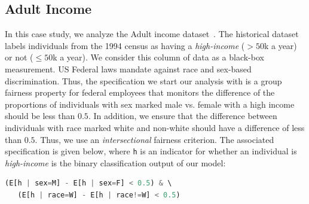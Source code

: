 \subsection{Adult Income}
\label{sec:casestudy:adult}
In this case study, we analyze the Adult income dataset~\citep{kohavi1996scaling}.
The historical dataset labels individuals from the 1994 census as having a \emph{high-income} ($>50$k a year) or not ($\leq50$k a year).
We consider this column of data as a black-box measurement. 
US Federal laws mandate against race and sex-based discrimination.
Thus, the specification we start our analysis with is a group fairness property for federal employees that monitors the difference of the proportions of individuals with sex marked male vs. female with a high income should be less than $0.5$.
In addition, we ensure that the difference between individuals with race marked white and non-white should have a difference of less than $0.5$.  
Thus, we use an \textit{intersectional} fairness criterion.
The associated specification is given below, where \texttt{h} is an indicator for whether an individual is \emph{high-income} is the binary classification output of our model:

\begin{lstlisting}[columns=flexible, language=Python, basicstyle=\small]
   (E[h | sex=M] - E[h | sex=F] < 0.5) & \ 
   (E[h | race=W] - E[h | race!=W] < 0.5)
\end{lstlisting}

